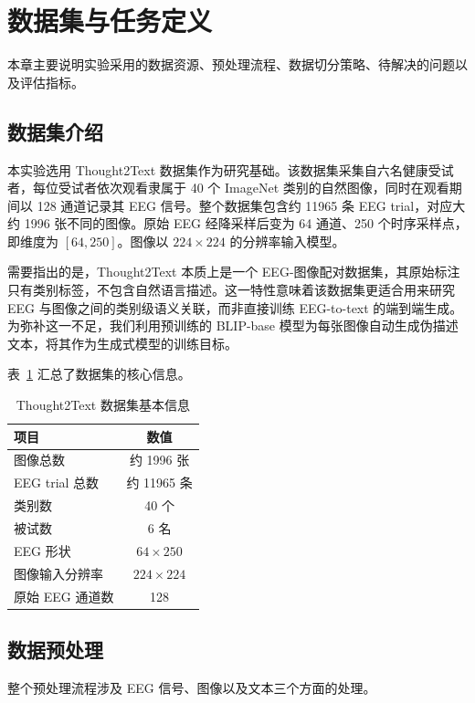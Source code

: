 \section{数据集与任务定义}

本章主要说明实验采用的数据资源、预处理流程、数据切分策略、待解决的问题以及评估指标。

\subsection{数据集介绍}

本实验选用 Thought2Text 数据集作为研究基础。该数据集采集自六名健康受试者，每位受试者依次观看隶属于 40 个 ImageNet 类别的自然图像，同时在观看期间以 128 通道记录其 EEG 信号。整个数据集包含约 11965 条 EEG trial，对应大约 1996 张不同的图像。原始 EEG 经降采样后变为 64 通道、250 个时序采样点，即维度为 $[64, 250]$。图像以 $224\times224$ 的分辨率输入模型。

需要指出的是，Thought2Text 本质上是一个 EEG-图像配对数据集，其原始标注只有类别标签，不包含自然语言描述。这一特性意味着该数据集更适合用来研究 EEG 与图像之间的类别级语义关联，而非直接训练 EEG-to-text 的端到端生成。为弥补这一不足，我们利用预训练的 BLIP-base 模型为每张图像自动生成伪描述文本，将其作为生成式模型的训练目标。

表~\ref{tab:dataset} 汇总了数据集的核心信息。

\begin{table}[htbp]
  \centering
  \caption{Thought2Text 数据集基本信息}
  \label{tab:dataset}
  \begin{tabular}{l c}
    \toprule
    项目 & 数值 \\
    \midrule
    图像总数 & 约 1996 张 \\
    EEG trial 总数 & 约 11965 条 \\
    类别数 & 40 个 \\
    被试数 & 6 名 \\
    EEG 形状 & $64\times250$ \\
    图像输入分辨率 & $224\times224$ \\
    原始 EEG 通道数 & 128 \\
    \bottomrule
  \end{tabular}
\end{table}

\subsection{数据预处理}

整个预处理流程涉及 EEG 信号、图像以及文本三个方面的处理。

